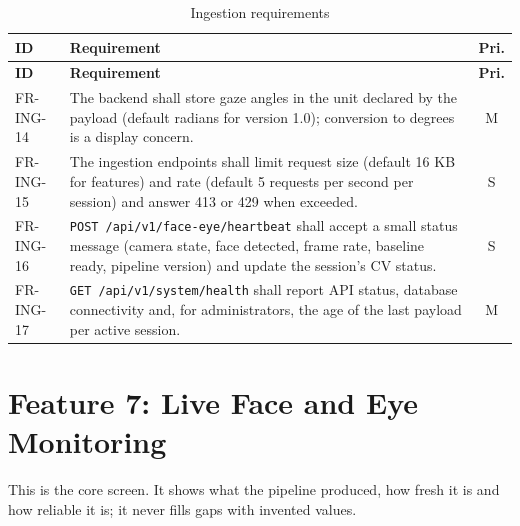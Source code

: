 \documentclass[a4paper,11pt]{scrreprt}
\makeatletter
\newenvironment{reqtable}[1]{%
  \small
  \begin{longtable}{@{}>{\ttfamily\footnotesize}p{2.55cm}>{\raggedright\arraybackslash}p{10.7cm}c@{}}
  \caption{#1}\\
  \toprule \textbf{ID} & \textbf{Requirement} & \textbf{Pri.}\\ \midrule
  \endfirsthead
  \toprule \textbf{ID} & \textbf{Requirement} & \textbf{Pri.}\\ \midrule
  \endhead
  \bottomrule
  \endfoot
}{%
  \end{longtable}\normalsize
}
\newcommand{\req}[3]{#1 & #2 & #3 \\ \midrule}
\newcommand{\code}[1]{\texttt{#1}}
\makeatother
\begin{document}
\begin{reqtable}{Ingestion requirements}
\req{FR-ING-14}{The backend shall store gaze angles in the unit declared by the payload (default radians for version 1.0); conversion to degrees is a display concern.}{M}
\req{FR-ING-15}{The ingestion endpoints shall limit request size (default 16 KB for features) and rate (default 5 requests per second per session) and answer 413 or 429 when exceeded.}{S}
\req{FR-ING-16}{\code{POST /api/v1/face-eye/heartbeat} shall accept a small status message (camera state, face detected, frame rate, baseline ready, pipeline version) and update the session's CV status.}{S}
\req{FR-ING-17}{\code{GET /api/v1/system/health} shall report API status, database connectivity and, for administrators, the age of the last payload per active session.}{M}
\end{reqtable}

\section{Feature 7: Live Face and Eye Monitoring}
This is the core screen. It shows what the pipeline produced, how fresh it is and how reliable it is; it never fills gaps with invented values.
\end{document}
